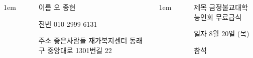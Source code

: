 \documentclass[	25pt, 
							a0paper, 
							portrait, %
							margin=0mm, %
							innermargin=10mm,  		%
							blockverticalspace=4mm, %
							colspace=5mm, 
							subcolspace=0mm
							]{tikzposter}
\begin{document}
\begin{columns}
			{
					\setlength{\leftmargini}{4em}
					\setlength{\labelsep} {1em}
				\begin{LARGE}
					\begin{itemize}
					\item [이름] 오 종현
					\item [전번] 010 2999 6131
					\item [주소] 좋은사람들 재가복지센터 동래구 중앙대로 1301번길 22
					\end{itemize}
				\end{LARGE}
			}



			{
					\setlength{\leftmargini}{4em}
					\setlength{\labelsep} {1em}
				\begin{LARGE}
					\begin{itemize}
					\item [제목] 금정불교대학 능인회 무료급식
					\item [일자] 8월 20일 (목)
					\item [참석] 
					\end{itemize}
				\end{LARGE}
			}



	\end{columns}
\end{document}
